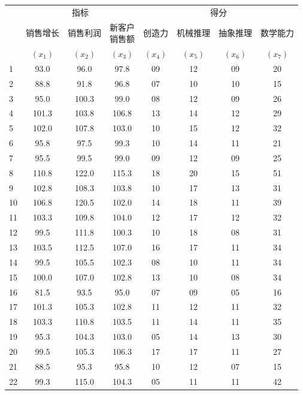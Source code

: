 
\begin{mvtable}
\label{tab:9.12}
\small
\begin{tabular}{l|ccccccc}
\toprule
& \multicolumn{3}{c|}{指\quad 标} & \multicolumn{4}{c}{得\quad 分}\\
\cmidrule(lr){2-4}\cmidrule(l){5-8}
& 销售增长 & 销售利润 & \makecell{新客户\\销售额} & 创造力 & 机械推理 & 抽象推理 & 数学能力\\
& $(x_1)$ & $(x_2)$ & $(x_3)$ & $(x_4)$ & $(x_5)$ & $(x_6)$ & $(x_7)$\\
\midrule
1 & 93.0 & 96.0 & 97.8 & 09 & 12 & 09 & 20\\
2 & 88.8 & 91.8 & 96.8 & 07 & 10 & 10 & 15\\
3 & 95.0 & 100.3 & 99.0 & 08 & 12 & 09 & 26\\
4 & 101.3 & 103.8 & 106.8 & 13 & 14 & 12 & 29\\
5 & 102.0 & 107.8 & 103.0 & 10 & 15 & 12 & 32\\
6 & 95.8 & 97.5 & 99.3 & 10 & 14 & 11 & 21\\
7 & 95.5 & 99.5 & 99.0 & 09 & 12 & 09 & 25\\
8 & 110.8 & 122.0 & 115.3 & 18 & 20 & 15 & 51\\
9 & 102.8 & 108.3 & 103.8 & 10 & 17 & 13 & 31\\
10 & 106.8 & 120.5 & 102.0 & 14 & 18 & 11 & 39\\
11 & 103.3 & 109.8 & 104.0 & 12 & 17 & 12 & 32\\
12 & 99.5 & 111.8 & 100.3 & 10 & 18 & 08 & 31\\
13 & 103.5 & 112.5 & 107.0 & 16 & 17 & 11 & 34\\
14 & 99.5 & 105.5 & 102.3 & 08 & 10 & 11 & 34\\
15 & 100.0 & 107.0 & 102.8 & 13 & 10 & 08 & 34\\
16 & 81.5 & 93.5 & 95.0 & 07 & 09 & 05 & 16\\
17 & 101.3 & 105.3 & 102.8 & 11 & 12 & 11 & 32\\
18 & 103.3 & 110.8 & 103.5 & 11 & 14 & 11 & 35\\
19 & 95.3 & 104.3 & 103.0 & 05 & 14 & 13 & 30\\
20 & 99.5 & 105.3 & 106.3 & 17 & 17 & 11 & 27\\
21 & 88.5 & 95.3 & 95.8 & 10 & 12 & 07 & 15\\
22 & 99.3 & 115.0 & 104.3 & 05 & 11 & 11 & 42\\

\end{tabular}
\end{mvtable}
